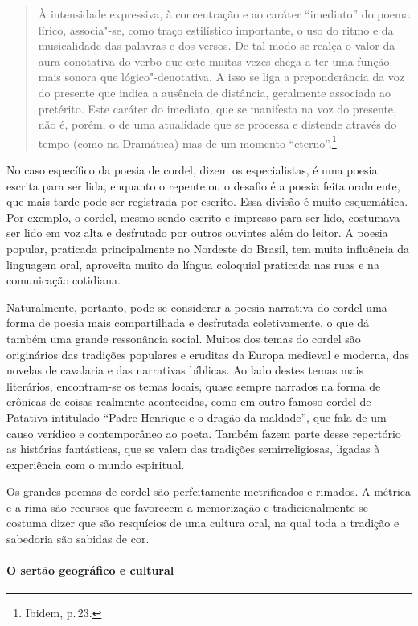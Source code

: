 \documentclass[11pt]{extarticle}
\begin{document}
\begin{quote}
À intensidade expressiva, à concentração e ao caráter ``imediato'' do poema lírico, associa"-se, como traço estilístico importante, o uso do ritmo e da musicalidade das palavras e dos versos. De tal modo se realça o valor da aura conotativa do verbo que este muitas vezes chega a ter uma função mais sonora que lógico"-denotativa. A isso se liga a preponderância da voz do presente que indica a ausência de distância, geralmente associada ao pretérito. Este caráter do imediato, que se manifesta na voz do presente, não é, porém, o de uma atualidade que se processa e distende através do tempo (como na Dramática) mas de um momento ``eterno''.\footnote{Ibidem, p.\,23.}
\end{quote}

No caso específico da poesia de cordel, dizem os especialistas, é uma poesia escrita para
ser lida, enquanto o repente ou o desafio é a poesia feita oralmente, que mais tarde pode
ser registrada por escrito. Essa divisão é muito esquemática. Por exemplo, o
cordel, mesmo sendo escrito e impresso para ser lido, costumava ser lido em
voz alta e desfrutado por outros ouvintes além do leitor. A poesia popular,
praticada principalmente no Nordeste do Brasil, tem muita influência da
linguagem oral, aproveita muito da língua coloquial praticada nas ruas e na
comunicação cotidiana. 

Naturalmente, portanto, pode-se considerar a poesia narrativa do cordel uma
forma de poesia mais compartilhada e desfrutada coletivamente, o que dá também
uma grande ressonância social. Muitos dos temas do cordel são originários das
tradições populares e eruditas da Europa medieval e moderna, das novelas de cavalaria e das narrativas
bíblicas. Ao lado destes temas mais literários, encontram-se os temas locais,
quase sempre narrados na forma de crônicas de coisas realmente acontecidas,
como em outro famoso cordel de Patativa intitulado  “Padre Henrique e o dragão da maldade”, que fala de um causo verídico e contemporâneo ao poeta. Também fazem parte desse repertório as histórias
fantásticas, que se valem das tradições semirreligiosas, ligadas à experiência
com o mundo espiritual. 

Os grandes poemas de cordel são perfeitamente metrificados e rimados. A métrica
e a rima são recursos que favorecem a memorização e tradicionalmente se costuma
dizer que são resquícios de uma cultura oral, na qual toda a tradição e
sabedoria são sabidas de cor.  


\paragraph{O sertão geográfico e cultural}
\end{document}
